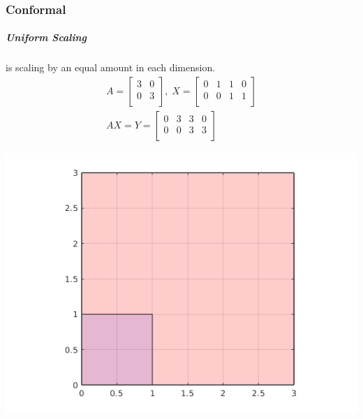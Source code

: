 \documentclass[MathsNotesBase.tex]{subfiles}
\begin{document}
{		\subsubsection{Conformal}
		\subparagraph{Uniform Scaling} is scaling by an equal amount in each dimension.
		\begin{align*}
		A =
		\begin{bmatrix}    
		3  &  0 \\
		0  &  3 \\		
		\end{bmatrix}
		,\; X = 
		\begin{bmatrix}  
		0   &  1  &   1  &   0 \\
		0   &  0  &   1  &   1	\\	
		\end{bmatrix} \\[10pt]
		AX = Y = 
		\begin{bmatrix}   
		0  &   3  &  3  &  0 \\
		0  &   0  &  3  &  3 \\
		\end{bmatrix}
		\end{align*}
	
		\begin{center}
		\includegraphics[scale=0.85]{resources/img/GeometryOfMatrices_images/uniform_scaling.png}
		\end{center}
		
}
\end{document}
